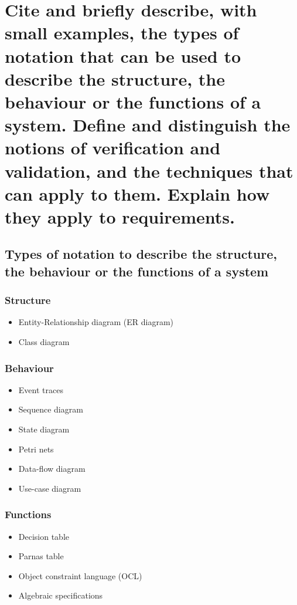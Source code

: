 \clearpage{}
\section{Cite and briefly describe, with small examples, the types of
notation that can be used to describe the structure, the behaviour or the
functions of a system. Define and distinguish the notions of verification
and validation, and the techniques that can apply to them. Explain how
they apply to requirements.}

\subsection{Types of notation to describe the structure, the behaviour or the functions
of a system}

\subsubsection{Structure}

\begin{itemize}
    \item Entity-Relationship diagram (ER diagram)
    \item Class diagram
\end{itemize}

\subsubsection{Behaviour}

\begin{itemize}
    \item Event traces
    \item Sequence diagram
    \item State diagram
    \item Petri nets
    \item Data-flow diagram
    \item Use-case diagram
\end{itemize}

\subsubsection{Functions}

\begin{itemize}
    \item Decision table
    \item Parnas table
    \item Object constraint language (OCL)
    \item Algebraic specifications
\end{itemize}

